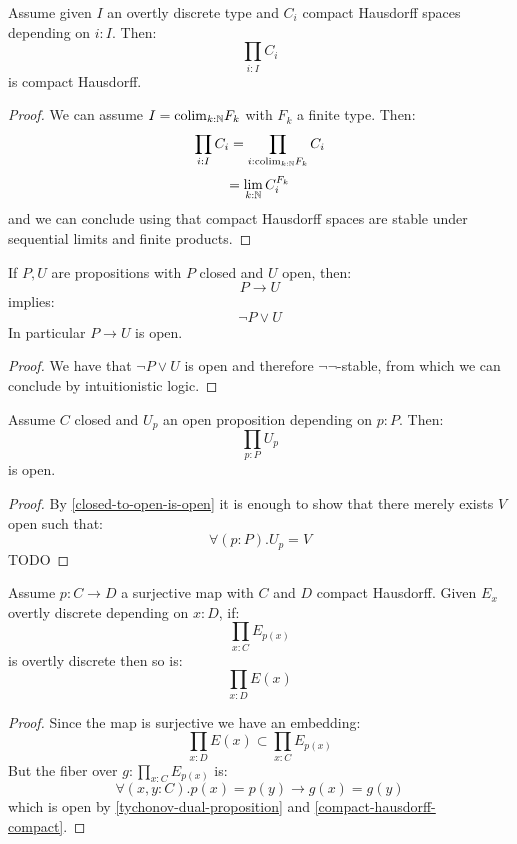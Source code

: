\begin{theorem}[Tychonov]
Assume given $I$ an overtly discrete type and $C_i$ compact Hausdorff spaces depending on $i:I$. Then:
\[\prod_{i:I}C_i\]
is compact Hausdorff.
\end{theorem}

\begin{proof}
We can assume $I = \mathrm{colim}_{k:\mathbb{N}} F_k$ with $F_k$ a finite type. Then:
\[\prod_{i:I}C_i = \prod_{i:\mathrm{colim}_{k:\mathbb{N}} F_k} C_i\]
\[= \lim_{k:\mathbb{N}} C_i^{F_k}\]
and we can conclude using that compact Hausdorff spaces are stable under sequential limits and finite products.
\end{proof}

\begin{lemma}\label{closed-to-open-is-open}
If $P,U$ are propositions with $P$ closed and $U$ open, then:
\[P\to U\]
implies:
\[\neg P \lor U\]
In particular $P\to U$ is open.
\end{lemma}

\begin{proof}
We have that $\neg P\lor U$ is open and therefore $\neg\neg$-stable, from which we can conclude by intuitionistic logic.
\end{proof}

\begin{lemma}\label{tychonov-dual-proposition}
Assume $C$ closed and $U_p$ an open proposition depending on $p:P$. Then:
\[\prod_{p:P}U_p\]
is open.
\end{lemma}

\begin{proof}
By \cref{closed-to-open-is-open} it is enough to show that there merely exists $V$ open such that:
\[\forall (p:P). U_p = V\]
TODO
\end{proof}

\begin{lemma}\label{tychonov-dual-auxiliary}
Assume $p:C\to D$ a surjective map with $C$ and $D$ compact Hausdorff. Given $E_x$ overtly discrete depending on $x:D$, if:
\[\prod_{x:C}E_{p(x)}\]
is overtly discrete then so is:
\[\prod_{x:D}E(x)\]
\end{lemma}

\begin{proof}
Since the map is surjective we have an embedding:
\[\prod_{x:D}E(x)\subset \prod_{x:C}E_{p(x)}\]
But the fiber over $g:\prod_{x:C}E_{p(x)}$ is:
\[\forall (x,y:C). p(x)=p(y) \to g(x)=g(y)\]
which is open by \cref{tychonov-dual-proposition} and \cref{compact-hausdorff-compact}.
\end{proof}

